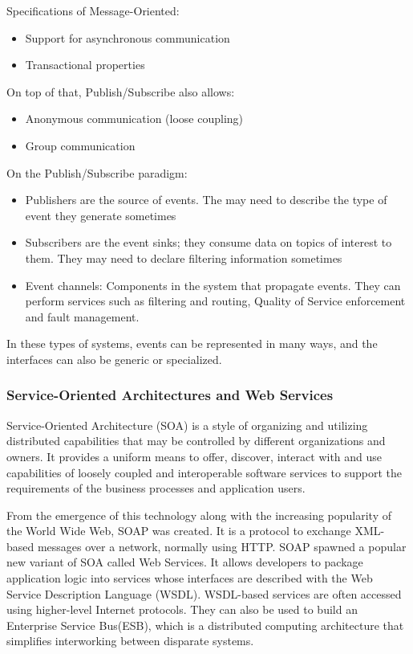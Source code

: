     Specifications of Message-Oriented:
    \begin{itemize}
        \item Support for asynchronous communication
        \item Transactional properties
    \end{itemize}

    On top of that, Publish/Subscribe also allows:
    \begin{itemize}
        \item Anonymous communication (loose coupling)
        \item Group communication
    \end{itemize}

    On the Publish/Subscribe paradigm:
    \begin{itemize}
        \item Publishers are the source of events. The may need to describe the type
        of event they generate sometimes
        \item Subscribers are the event sinks; they consume data on topics of interest to them.
        They may need to declare filtering information sometimes
        \item Event channels: Components in the system that propagate events. They can perform
        services such as filtering and routing, Quality of Service enforcement and fault management.
    \end{itemize}

    In these types of systems, events can be represented in many ways, and the interfaces can also be
    generic or specialized.

    \subsubsection{Service-Oriented Architectures and Web Services}
    Service-Oriented Architecture (SOA) is a style of organizing and utilizing distributed capabilities
    that may be controlled by different organizations and owners. It provides a uniform means to offer,
    discover, interact with and use capabilities of loosely coupled and interoperable software services
    to support the requirements of the business processes and application users.

    From the emergence of this technology along with the increasing popularity of the World Wide Web, SOAP
    was created. It is a protocol to exchange XML-based messages over a network, normally using HTTP. SOAP
    spawned a popular new variant of SOA called Web Services. It allows developers to package application
    logic into services whose interfaces are described with the Web Service Description Language (WSDL).
    WSDL-based services are often accessed using higher-level Internet protocols. They can also be used
    to build an Enterprise Service Bus(ESB), which is a distributed computing architecture that simplifies
    interworking between disparate systems.

